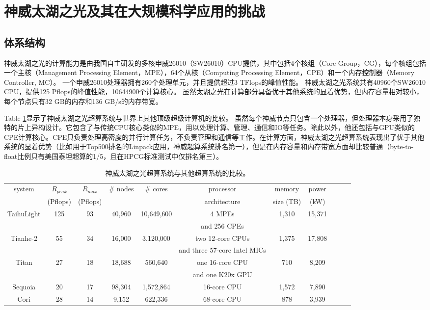 \documentclass[degree=doctor]{thuthesis}
\begin{document}
\section{神威太湖之光及其在大规模科学应用的挑战}
\label{sec:sunway}

\subsection{体系结构}
神威太湖之光的计算能力是由我国自主研发的多核申威26010（SW26010）CPU提供，其中包括4个核组（Core Group，CG）\citep {fu2016sunway}，每个核组包括一个主核（Management Processing Element，MPE），64个从核（Computing Processing Element，CPE）和一个内存控制器（Memory Controller, MC）。 一个申威26010处理器拥有260个处理单元，并且提供超过3 TFlops的峰值性能。 神威太湖之光系统共有40960个SW26010 CPU，提供125 Pflops的峰值性能，10644900个计算核心。 虽然太湖之光在计算部分具备优于其他系统的显着优势，但内存容量相对较小，每个节点只有32 GB的内存和136 GB/s的内存带宽。

Table \ref{tb:system-comp}显示了神威太湖之光超算系统与世界上其他顶级超级计算机的比较。 虽然每个神威节点只包含一个处理器，但处理器本身采用了独特的片上异构设计。它包含了与传统CPU核心类似的MPE，用以处理计算、管理、通信和IO等任务。除此以外，他还包括与GPU类似的CPE计算核心。CPE只负责处理高密度的并行计算任务，不负责管理和通信等工作。在计算方面，神威太湖之光超算系统表现出了优于其他系统的显着优势（比如用于Top500排名的Linpack应用，神威超算系统排名第一），但是在内存容量和内存带宽方面却比较普通（byte-to-float比例只有美国泰坦超算的1/5，且在HPCG标准测试中仅排名第三）。

\begin{table}[h]
\footnotesize
\caption{神威太湖之光超算系统与其他超算系统的比较。}
\label{tb:system-comp}
\begin{tabular*}{\textwidth}{ccccccccccc}
\hline\hline
  system & $R_{peak}$ & $R_{max}$ & \# nodes & \# cores & processor & memory & power\\
  & (Pflops) & (Pflops) &&& architecture & size (TB) & (kW)\\\hline
  TaihuLight & 125  & 93 & 40,960 & 10,649,600 & 4 MPEs & 1,310 & 15,371 \\
  & & & & & and 256 CPEs \\\hline
  Tianhe-2 & 55 & 34 & 16,000 & 3,120,000 & two 12-core CPUs & 1,375 & 17,808\\
  & & & & &and three 57-core Intel MICs \\\hline
  Titan & 27 & 18 & 18,688 & 560,640 & one 16-core CPU & 710 & 8,209 \\
  & & & & &and one K20x GPU \\\hline
  Sequoia & 20 & 17 & 98,304 & 1,572,864 & 16-core CPU & 1,572 & 7,890 \\\hline
  Cori & 28 & 14 & 9,152 & 622,336 & 68-core CPU & 878 & 3,939\\\hline
\hline
\end{tabular*}
\end{table}
\end{document}
